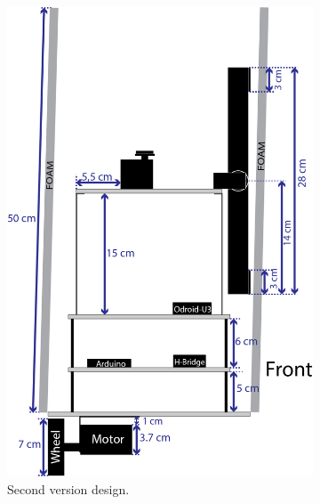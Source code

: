 \begin{figure}[h]
\begin{subfigure}[c]{0.3\textwidth}
	\includegraphics[width=\textwidth]{./Images/upperThirdD.png}
	\caption{Second version design.}
	\label{fig:triskar-second-design}
	\end{subfigure}
	\begin{subfigure}[c]{0.3\textwidth}
	\centering

\end{subfigure}
\end{figure}

